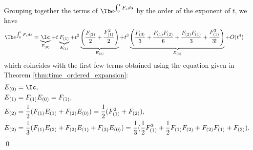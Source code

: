 \begin{example}
Grouping together the terms of $\Tb e^{\int_0^t F_s ds}$ by the order of the exponent of $t$, we have 
\begin{align*}
    \Tb e^{\int_0^t F_s ds} &= \underbrace{\Ic}_{E_{(0)}} + t \underbrace{F_{(1)}}_{E_{(1)}} + t^2 \underbrace{\left( \frac{F_{(2)}}{2} + \frac{F_{(1)}^2}{2} \right)}_{E_{(2)}} + t^3 \underbrace{\left(\frac{F_{(3)}}{3}+\frac{F_{(1)}F_{(2)}}{6} +\frac{F_{(2)}F_{(1)}}{3} + \frac{F_{(1)}^3}{3!} \right)}_{E_{(3)}} +O(t^4)
\end{align*}
which coincides with the first few terms obtained using the equation given in Theorem \ref{thm:time_ordered_expansion}:
\begin{align*}
    E_{(0)} &= \Ic,\\
    E_{(1)} &= F_{(1)}E_{(0)} = F_{(1)},\\
    E_{(2)} &= \frac{1}{2}(F_{(1)}E_{(1)} +  F_{(2)}E_{(0)}) = \frac{1}{2}(F_{(1)}^2 + F_{(2)}),\\
    E_{(2)} &= \frac{1}{3}(F_{(1)}E_{(2)} +  F_{(2)}E_{(1)} + F_{(3)}E_{(0)}) = \frac{1}{3}(\frac{1}{2}F_{(1)}^3 + \frac{1}{2}F_{(1)}F_{(2)} + F_{(2)}F_{(1)} +F_{(3)}).
\end{align*}
\hfill\qed
\end{example}
